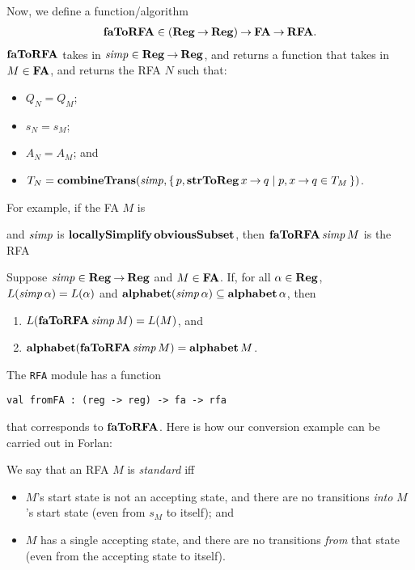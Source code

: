 Now, we define a function/algorithm
\begin{gather*}
\mathbf{faToRFA}\in(\mathbf{Reg}\mathbin{\to}\mathbf{Reg})\mathbin{\to}\mathbf{FA}\mathbin{\to}\mathbf{RFA} .  
\end{gather*}
$\mathbf{faToRFA}$ takes in ${\it simp}\in\mathbf{Reg}\mathbin{\to}\mathbf{Reg}$, and returns a
function that takes in $M\in\mathbf{FA}$, and returns the RFA
$N$ such that:
\begin{itemize}
\item $Q_N = Q_M$;

\item $s_N = s_M$;

\item $A_N = A_M$; and

\item $T_N = \mathbf{combineTrans}({\it simp},
  \{ \, p, \mathbf{strToReg}\,x\mathbin{\to} q \mid p,x\mathbin{\to} q\in T_M \, \})$.
\end{itemize}

For example, if the FA $M$ is
\begin{center}
  
\end{center}
and ${\it simp}$ is $\mathbf{locallySimplify}\,\mathbf{obviousSubset}$,
then $\mathbf{faToRFA}\,{\it simp}\,M$ is the RFA
\begin{center}
  
\end{center}

\begin{proposition}
Suppose ${\it simp}\in\mathbf{Reg}\mathbin{\to}\mathbf{Reg}$ and $M\in\mathbf{FA}$.  If, for all
$\alpha\in\mathbf{Reg}$, $L({\it simp}\,\alpha)=L(\alpha)$ and
$\mathbf{alphabet}({\it simp}\,\alpha)\subseteq\mathbf{alphabet}\,\alpha$, then
\begin{enumerate}[\quad(1)]
\item $L(\mathbf{faToRFA}\,{\it simp}\,M) = L(M)$, and

\item $\mathbf{alphabet}(\mathbf{faToRFA}\,{\it simp}\,M) = \mathbf{alphabet}\,M$.
\end{enumerate}
\end{proposition}

The \texttt{RFA} module has a function
\begin{verbatim}
val fromFA : (reg -> reg) -> fa -> rfa
\end{verbatim}
that corresponds to $\mathbf{faToRFA}$.
Here is how our conversion example can be carried out in Forlan:


We say that an RFA $M$ is \emph{standard} iff
\begin{itemize}
\item $M$'s start state is not an accepting state, and there are no
  transitions \emph{into} $M$'s start state (even from $s_M$ to
  itself); and

\item $M$ has a single accepting state, and there are no transitions
  \emph{from} that state (even from the accepting state to itself).
\end{itemize}

